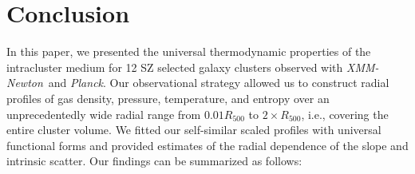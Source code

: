 \documentclass[traditabstract   ]{aa} %
\newcommand{\xmm}{{\it XMM-Newton}}
\newcommand{\planck}{{\it Planck}}
\begin{document}
\section{Conclusion}

In this paper, we presented the universal thermodynamic properties of the intracluster medium for 12 SZ selected galaxy clusters observed with \xmm\ and \planck. Our observational strategy allowed us to construct radial profiles of gas density, pressure, temperature, and entropy over an unprecedentedly wide radial range from $0.01R_{500}$ to $2\times R_{500}$, i.e., covering the entire cluster volume. We fitted our self-similar scaled profiles with universal functional forms and provided estimates of the radial dependence of the slope and intrinsic scatter. Our findings can be summarized as follows:
\end{document}
